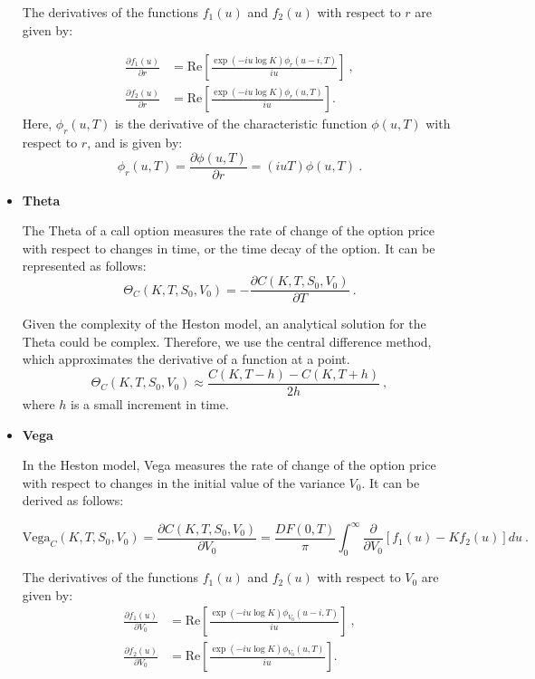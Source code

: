 \begin{itemize}
The derivatives of the functions $ f_1(u) $ and $ f_2(u) $ with respect to $ r $ are given by:

\begin{equation}
\label{eq:derivative-r-f1-f2}
\begin{aligned}
\frac{ \partial  f_1(u)   }{\partial r}&= \mathrm{Re}\left[  \frac{\exp(-iu\log K) \phi_{r}(u-i,T)   }{iu}\right] \ ,  \\  
\frac{\partial  f_2(u)   }{\partial r } &= \mathrm{Re}\left[ \frac{\exp(-iu\log K) \phi_{r}(u,T)  }{iu}\right].
\end{aligned}
\end{equation}
Here, $\phi_{r}(u,T)$ is the derivative of the characteristic function $\phi(u,T)$ with respect to $r$, and is given by:
$$
\phi_{r}(u,T) = \frac{ \partial  \phi(u,T)}{\partial r} = (i u T) \phi(u,T) \ .
$$




\item \textbf{Theta} 

The Theta of a call option measures the rate of change of the option price with respect to changes in time, or the time decay of the option. It can be represented as follows:
$$
\Theta_C(K,T, S_0, V_0) = - \frac{\partial C(K,T, S_0, V_0)}{\partial T} \ . 
$$

Given the complexity of the Heston model, an analytical solution for the Theta could be complex. Therefore, we use the central difference method, which approximates the derivative of a function at a point.
$$
\Theta_C(K,T, S_0, V_0) \approx  \frac{C(K,T-h) - C(K,T+h)}{2h} \ , 
$$
where $h$ is a small increment in time. 

\item \textbf{Vega} 

In the Heston model, Vega measures the rate of change of the option price with respect to changes in the initial value of the variance $V_0$. It can be derived as follows:

$$
\text{Vega}_C(K,T, S_0, V_0) = \frac{\partial C(K,T, S_0, V_0)}{\partial V_0} = \frac{DF(0,T)}{\pi} \int_0^{\infty}\frac{ \partial  }{\partial V_0}  \left[f_1(u) - Kf_2(u)\right]du \ . 
$$

The derivatives of the functions $ f_1(u) $ and $ f_2(u) $ with respect to $ V_0$ are given by:
\begin{equation}
\label{eq:derivative-v0-f1-f2}
\begin{aligned}
\frac{ \partial  f_1(u)   }{\partial V_0}&= \mathrm{Re}\left[  \frac{\exp(-iu\log K) \phi_{V_0}(u-i,T)   }{iu}\right]  \ , \\  
\frac{\partial  f_2(u)   }{\partial V_0 } &= \mathrm{Re}\left[ \frac{\exp(-iu\log K) \phi_{V_0}(u,T)  }{iu}\right].
\end{aligned}
\end{equation}


\end{itemize}
